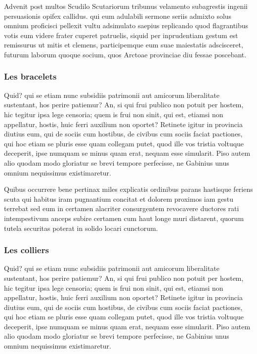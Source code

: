 \documentclass{framatexclass}
\begin{document}
Advenit post multos Scudilo Scutariorum tribunus velamento subagrestis ingenii persuasionis opifex callidus. qui eum adulabili sermone seriis admixto solus omnium proficisci pellexit vultu adsimulato saepius replicando quod flagrantibus votis eum videre frater cuperet patruelis, siquid per inprudentiam gestum est remissurus ut mitis et clemens, participemque eum suae maiestatis adscisceret, futurum laborum quoque socium, quos Arctoae provinciae diu fessae poscebant.


\subsubsection{Les bracelets}
Quid? qui se etiam nunc subsidiis patrimonii aut amicorum liberalitate sustentant, hos perire patiemur? An, si qui frui publico non potuit per hostem, hic tegitur ipsa lege censoria; quem is frui non sinit, qui est, etiamsi non appellatur, hostis, huic ferri auxilium non oportet? Retinete igitur in provincia diutius eum, qui de sociis cum hostibus, de civibus cum sociis faciat pactiones, qui hoc etiam se pluris esse quam collegam putet, quod ille vos tristia voltuque deceperit, ipse numquam se minus quam erat, nequam esse simularit. Piso autem alio quodam modo gloriatur se brevi tempore perfecisse, ne Gabinius unus omnium nequissimus existimaretur.

Quibus occurrere bene pertinax miles explicatis ordinibus parans hastisque feriens scuta qui habitus iram pugnantium concitat et dolorem proximos iam gestu terrebat sed eum in certamen alacriter consurgentem revocavere ductores rati intempestivum anceps subire certamen cum haut longe muri distarent, quorum tutela securitas poterat in solido locari cunctorum.


\subsubsection{Les colliers}
Quid? qui se etiam nunc subsidiis patrimonii aut amicorum liberalitate sustentant, hos perire patiemur? An, si qui frui publico non potuit per hostem, hic tegitur ipsa lege censoria; quem is frui non sinit, qui est, etiamsi non appellatur, hostis, huic ferri auxilium non oportet? Retinete igitur in provincia diutius eum, qui de sociis cum hostibus, de civibus cum sociis faciat pactiones, qui hoc etiam se pluris esse quam collegam putet, quod ille vos tristia voltuque deceperit, ipse numquam se minus quam erat, nequam esse simularit. Piso autem alio quodam modo gloriatur se brevi tempore perfecisse, ne Gabinius unus omnium nequissimus existimaretur.
\end{document}
